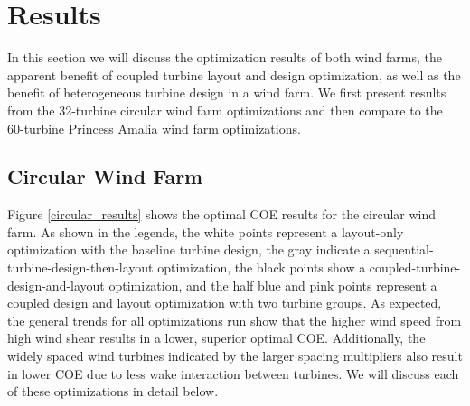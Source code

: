 \documentclass[wes, manuscript]{copernicus}
\begin{document}




\section{Results}
%
\newcommand\myeq{\mkern1.5mu{=}\mkern1.5mu}


In this section we will discuss the optimization results of both wind farms, the apparent benefit of coupled turbine layout and design optimization, as well as the benefit of heterogeneous turbine design in a wind farm.
We first present results from the 32-turbine circular wind farm optimizations and then compare to the 60-turbine Princess Amalia wind farm optimizations. 



\subsection{Circular Wind Farm}

Figure \ref{circular_results} shows the optimal COE results for the circular wind farm. As shown in the legends, the white points represent a layout-only optimization with the baseline turbine design, the gray indicate a sequential-turbine-design-then-layout optimization, the black points show a coupled-turbine-design-and-layout optimization, and the half blue and pink points represent a coupled design and layout optimization with two turbine groups.  As expected, the general trends for all optimizations run show that the higher wind speed from high wind shear results in a lower, superior optimal COE. Additionally, the widely spaced wind turbines indicated by the larger spacing multipliers also result in lower COE due to less wake interaction between turbines. We will discuss each of these optimizations in detail below.
\end{document}
